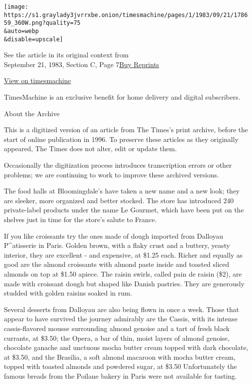 \texttt{[image: https://s1.graylady3jvrrxbe.onion/timesmachine/pages/1/1983/09/21/178659\_360W.png?quality=75\\\&auto=webp\\\&disable=upscale]}

See the article in its original context from\\
September 21, 1983, Section C, Page
7\href{https://store.nytimes3xbfgragh.onion/collections/new-york-times-page-reprints?utm_source=nytimes\&utm_medium=article-page\&utm_campaign=reprints}{Buy
Reprints}

\href{http://timesmachine.nytimes3xbfgragh.onion/timesmachine/1983/09/21/178659.html}{View
on timesmachine}

TimesMachine is an exclusive benefit for home delivery and digital
subscribers.

About the Archive

This is a digitized version of an article from The Times's print
archive, before the start of online publication in 1996. To preserve
these articles as they originally appeared, The Times does not alter,
edit or update them.

Occasionally the digitization process introduces transcription errors or
other problems; we are continuing to work to improve these archived
versions.

The food halls at Bloomingdale's have taken a new name and a new look;
they are sleeker, more organized and better stocked. The store has
introduced 240 private-label products under the name Le Gourmet, which
have been put on the shelves just in time for the store's salute to
France.

If you like croissants try the ones made of dough imported from Dalloyau
P\^{}atisserie in Paris. Golden brown, with a flaky crust and a buttery,
yeasty interior, they are excellent - and expensive, at \$1.25 each.
Richer and equally as good are the almond croissants with almond paste
inside and toasted sliced almonds on top at \$1.50 apiece. The raisin
swirls, called pain de raisin (\$2), are made with croissant dough but
shaped like Danish pastries. They are generously studded with golden
raisins soaked in rum.

Several desserts from Dalloyau are also being flown in once a week.
Those that appear to have survived the journey admirably are the Cassis,
with its intense cassis-flavored mousse surrounding almond genoise and a
tart of fresh black currants, at \$3.50; the Opera, a bar of thin, moist
layers of almond genoise, chocolate ganache and unctuous mocha butter
cream topped with dark chocolate, at \$3.50, and the Brasilia, a soft
almond macaroon with mocha butter cream, topped with toasted almonds and
powdered sugar, at \$3.50 Unfortunately the famous breads from the
Poilane bakery in Paris were not available for tasting.

